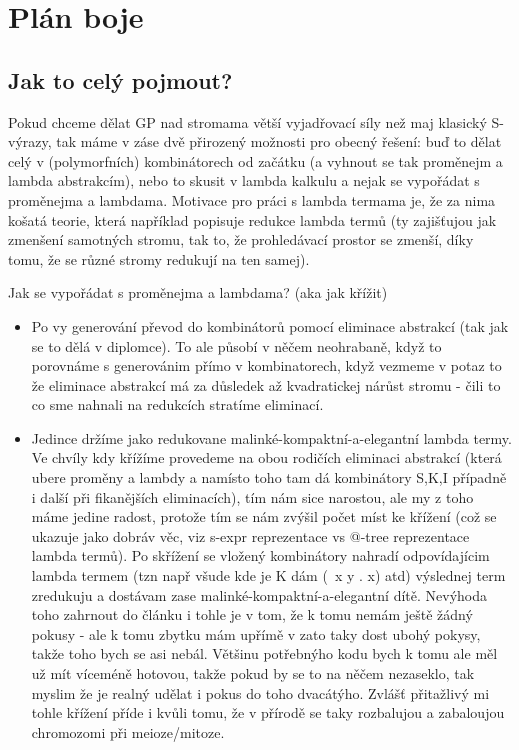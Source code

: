 \documentclass{sig-alternate}
\begin{document}


\section{Plán boje}

\subsection{Jak to celý pojmout?}

Pokud chceme dělat GP nad stromama větší vyjadřovací síly než maj klasický S-výrazy, tak máme v záse dvě přirozený možnosti pro obecný řešení: buď to dělat celý v (polymorfních) kombinátorech od začátku (a vyhnout se tak proměnejm a lambda abstrakcím), nebo to skusit v lambda kalkulu a nejak se vypořádat s proměnejma a lambdama. Motivace pro práci s lambda termama je, že za nima košatá teorie, která například popisuje redukce lambda termů (ty zajišťujou jak zmenšení samotných stromu, tak to, že prohledávací prostor se zmenší, díky tomu, že se různé stromy redukují na ten samej).

Jak se vypořádat s proměnejma a lambdama? (aka jak křížit)

\begin{itemize}
\item Po vy generování převod do kombinátorů pomocí eliminace abstrakcí (tak jak se to dělá v diplomce). To ale působí v něčem neohrabaně, když to porovnáme s generovánim přímo v kombinatorech, když vezmeme v potaz to že eliminace abstrakcí má za důsledek až kvadratickej nárůst stromu - čili to co sme nahnali na redukcích stratíme eliminací. 

\item Jedince držíme jako redukovane malinké-kompaktní-a-elegantní lambda termy. Ve chvíly kdy křížíme provedeme na obou rodičích eliminaci abstrakcí (která ubere proměny a lambdy a namísto toho tam dá kombinátory S,K,I případně i další při fikanějších eliminacích), tím nám sice narostou, ale my z toho máme jedine radost, protože tím se nám zvýšil počet míst ke křížení (což se ukazuje jako dobráv věc, viz s-expr reprezentace vs @-tree reprezentace lambda termů). Po skřížení se vložený kombinátory nahradí odpovídajícim lambda termem (tzn např všude kde je K dám (\ x y . x) atd) výslednej term zredukuju a dostávam zase malinké-kompaktní-a-elegantní dítě.
Nevýhoda toho zahrnout do článku i tohle je v tom, že k tomu nemám ještě žádný pokusy - ale k tomu zbytku mám upřímě v zato taky dost ubohý pokysy, takže toho bych se asi nebál. Většinu potřebnýho kodu bych k tomu ale měl už mít víceméně hotovou, takže pokud by se to na něčem nezaseklo, tak myslim že je realný udělat i pokus do toho dvacátýho. Zvlášť přitažlivý mi tohle křížení příde i kvůli tomu, že v přírodě se taky rozbalujou a zabaloujou chromozomi při meioze/mitoze.
\end{itemize}
\end{document}
